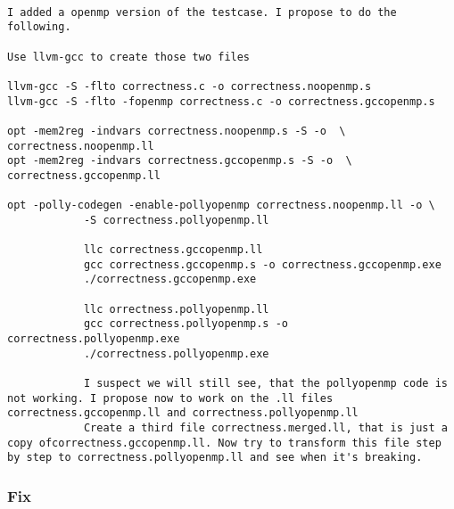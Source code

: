 \documentclass[a4paper,10pt]{article}
\begin{document}
\begin{verbatim}

I added a openmp version of the testcase. I propose to do the following.

Use llvm-gcc to create those two files

llvm-gcc -S -flto correctness.c -o correctness.noopenmp.s
llvm-gcc -S -flto -fopenmp correctness.c -o correctness.gccopenmp.s

opt -mem2reg -indvars correctness.noopenmp.s -S -o  \ correctness.noopenmp.ll
opt -mem2reg -indvars correctness.gccopenmp.s -S -o  \ correctness.gccopenmp.ll

opt -polly-codegen -enable-pollyopenmp correctness.noopenmp.ll -o \
			-S correctness.pollyopenmp.ll

			llc correctness.gccopenmp.ll
			gcc correctness.gccopenmp.s -o correctness.gccopenmp.exe
			./correctness.gccopenmp.exe

			llc orrectness.pollyopenmp.ll
			gcc correctness.pollyopenmp.s -o correctness.pollyopenmp.exe
			./correctness.pollyopenmp.exe

			I suspect we will still see, that the pollyopenmp code is not working. I propose now to work on the .ll files correctness.gccopenmp.ll and correctness.pollyopenmp.ll
			Create a third file correctness.merged.ll, that is just a copy ofcorrectness.gccopenmp.ll. Now try to transform this file step by step to correctness.pollyopenmp.ll and see when it's breaking.

\end{verbatim}
\subsubsection{Fix}
\end{document}
